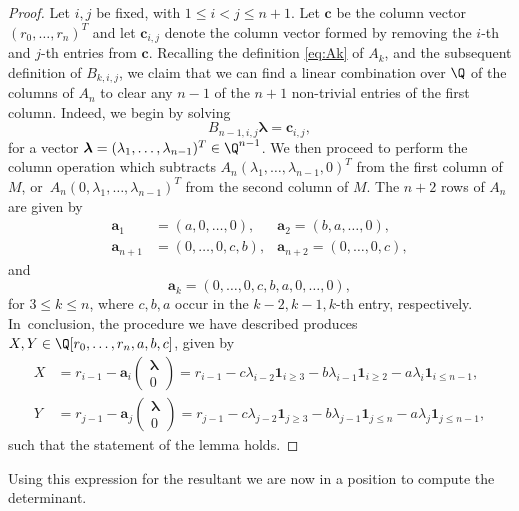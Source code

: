 \documentclass[JEP,XML,SOM,Unicode]{cedram}
\begin{document}
\begin{proof}
Let $i,j$ be fixed, with $1\leq i<j\leq n+1$.
Let $\boldsymbol{c}$ be the column vector $(r_0,\dots, r_n)^T$
and
let $\boldsymbol{c}_{i,j}$ denote the column vector formed by removing the $i$-th and $j$-th entries from $\boldsymbol{c}$.
Recalling the definition \eqref{eq:Ak} of $A_k$, and the subsequent definition of
$B_{k,i,j}$,
we claim that we can find a linear combination over $\Q$ of the columns of $A_n$ to
clear any $n-1$ of the $n+1$ non-trivial entries of the first column.
Indeed, we begin by solving
\[
B_{n-1,i,j}\boldsymbol{\lambda}=\boldsymbol{c}_{i,j},
\]
for a vector $\boldsymbol{\lambda}=(\lambda_1,\dots,\lambda_{n-1})^T\in\Q^{n-1}$.
We then proceed to perform the column operation which subtracts $A_n
(\lambda_1,\dots,\lambda_{n-1},0)^T$
from the first column of $M$, or~$A_n
(0,\lambda_1,\dots,\lambda_{n-1})^T$ from the second
	column of $M$.
The $n+2$ rows of $A_n$ are given by
\begin{align*}
\boldsymbol{a}_1&=(a,0,\dots,0), &\boldsymbol{a}_2=(b,a,\dots,0),\\
\boldsymbol{a}_{n+1}&=(0,\dots ,0,c,b),
&\boldsymbol{a}_{n+2}=(0,\dots ,0,c),
\end{align*}
and
\[
\boldsymbol{a}_{k}=(0,\dots,0,c,b,a,0,\dots,0),
\]
for $3\leq k\leq n$, where $c,b,a$ occur in the $k-2,k-1,k$-th entry, respectively.
In~conclusion, the procedure we have described produces $X,Y\in\Q[r_0,\dots, r_n,a,b,c]$, given by
\begin{align*}
X&=r_{i-1}-\boldsymbol{a}_{i}\begin{pmatrix}\boldsymbol{\lambda}\\ 0\end{pmatrix}
=r_{i-1}-c\lambda_{i-2}\mathbf{1}_{i\geq 3}-b\lambda_{i-1}\mathbf{1}_{i\geq 2}-a\lambda_{i}\mathbf{1}_{i\leq n-1},\\
Y&=r_{j-1}-\boldsymbol{a}_{j}\begin{pmatrix}\boldsymbol{\lambda}\\ 0\end{pmatrix}=r_{j-1}-c\lambda_{j-2}\mathbf{1}_{j\geq 3}-b\lambda_{j-1}\mathbf{1}_{j\leq n}
-a\lambda_j\mathbf{1}_{j\leq n-1},
\end{align*}
such that the statement of the lemma holds.
\end{proof}

Using this expression for the resultant we are now in a position to compute the determinant.
\end{document}
